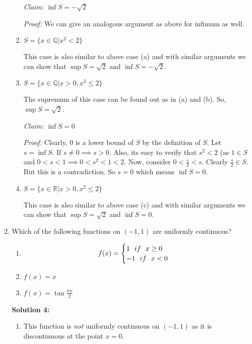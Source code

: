 \documentclass[11pt]{amsart}
\newcommand{\bbQ}{\mathbb{Q}}
\newcommand{\bbR}{\mathbb{R}}
\theoremstyle{definition}
\begin{document}
\begin{enumerate}[wide, labelwidth=!, labelindent=0pt]
\begin{enumerate}[label=(\alph*)]
\textit{Claim:} $\inf S = -\sqrt{2}$

\textit{Proof:} We can give an analogous argument as above for infimum as well. 

\item $S=\{x \in \bbQ|x^2 < 2\}$

This case is also similar to above case (a) and with similar arguments we can show that $\sup S = \sqrt{2}$ and $\inf S = -\sqrt{2}$.

\item $S=\{x \in \bbQ|x > 0, x^2 \le 2\}$

The supremum of this case can be found out as in (a) and (b). So, $\sup S = \sqrt{2}$.

\textit{Claim:} $\inf S = 0$

\textit{Proof:} Clearly, $0$ is a lower bound of $S$ by the definition of $S$. Let $s = \inf S$. If $s \ne 0 \implies s > 0$. Also, its easy to verify that $s^2 < 2$ (as $1 \in S$ and $0 < s < 1 \implies 0 < s^2 < 1 < 2$. Now, consider $0 < \frac{s}{2} < s$. Clearly $\frac{s}{2} \in S$. But this is a contradiction. So $ s = 0$ which means $\inf S = 0$.

\item $S=\{x \in \bbR|x > 0, x^2 \le 2\}$

This case is also similar to above case (c) and with similar arguments we can show that $\sup S = \sqrt{2}$ and $\inf S = 0$.

\end{enumerate}

\item Which of the following functions on $(-1,1)$ are uniformly continuous? 

\begin{enumerate}[label=(\alph*)]
\item \[
f(x)=
\begin{cases}
1\ \ if \ \ \textup{$x \ge 0$}\\
-1 \ \ if \ \ \textup{$x < 0$}
\end{cases}
\]
\item $f(x)=x$
\item $f(x)=\tan \frac{\pi x}{2}$
\end{enumerate}

\textbf{Solution 4:}

\begin{enumerate}[label=(\alph*)]

\item This function is \textit{not} uniformly continuous on $(-1,1)$ as it is discontinuous at the point $x = 0$.


\end{enumerate}
\end{enumerate}
\end{document}
